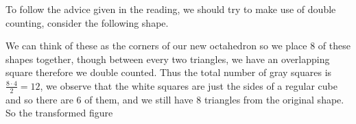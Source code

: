 \documentclass[11pt]{article}
\begin{document}
To follow the advice given in the reading, we should try to make use of double counting, consider the following shape.

We can think of these as the corners of our new octahedron so we place 8 of these shapes together, though between every two triangles, we have an overlapping square therefore we double counted. Thus the total number of gray squares is \(\frac{8 \cdot 4}{2}= 12\), we observe that the white squares are just the sides of a regular cube and so there are 6 of them, and we still have 8 triangles from the original shape. So the transformed figure
\end{document}
